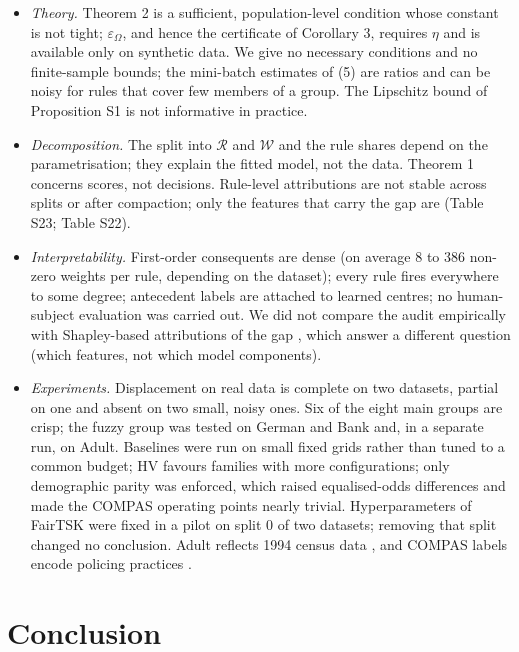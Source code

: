 \begin{itemize}
\tightlist
\item
  \emph{Theory.} Theorem 2 is a sufficient, population-level condition whose constant is not tight; \(\varepsilon_\Omega\), and hence the certificate of Corollary 3, requires \(\eta\) and is available only on synthetic data. We give no necessary conditions and no finite-sample bounds; the mini-batch estimates of (5) are ratios and can be noisy for rules that cover few members of a group. The Lipschitz bound of Proposition S1 is not informative in practice.
\item
  \emph{Decomposition.} The split into \(\mathcal R\) and \(\mathcal W\) and the rule shares depend on the parametrisation; they explain the fitted model, not the data. Theorem 1 concerns scores, not decisions. Rule-level attributions are not stable across splits or after compaction; only the features that carry the gap are (Table S23; Table S22).
\item
  \emph{Interpretability.} First-order consequents are dense (on average 8 to 386 non-zero weights per rule, depending on the dataset); every rule fires everywhere to some degree; antecedent labels are attached to learned centres; no human-subject evaluation was carried out. We did not compare the audit empirically with Shapley-based attributions of the gap \cite{begley}, which answer a different question (which features, not which model components).
\item
  \emph{Experiments.} Displacement on real data is complete on two datasets, partial on one and absent on two small, noisy ones. Six of the eight main groups are crisp; the fuzzy group was tested on German and Bank and, in a separate run, on Adult. Baselines were run on small fixed grids rather than tuned to a common budget; HV favours families with more configurations; only demographic parity was enforced, which raised equalised-odds differences and made the COMPAS operating points nearly trivial. Hyperparameters of FairTSK were fixed in a pilot on split 0 of two datasets; removing that split changed no conclusion. Adult reflects 1994 census data \cite{ding}, and COMPAS labels encode policing practices \cite{compas}.
\end{itemize}

\hypertarget{conclusion}{%
\section{Conclusion}\label{conclusion}}

